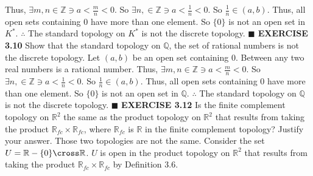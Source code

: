 \documentclass[12pt]{article}
\begin{document}
  Thus, \(\exists m, n \in \mathbb{Z} \ni a < \frac{m}{n} < 0\).
  \newline
  So \(\exists n, \in \mathbb{Z} \ni a < \frac{1}{n} < 0\).
  \newline
  So \(\frac{1}{n} \in (a,b)\).
  \newline
  Thus, all open sets containing 0 have more than one element.
  \newline
  So \(\{0\}\) is not an open set in \(K^*\).
  \newline
  \(\therefore\) The standard topology on \(K^*\) is not the discrete topology.
  \newline \(\blacksquare\)
  \newpage
  \noindent
  \textbf{EXERCISE 3.10} Show that the standard topology on \(\mathbb{Q}\), the set of rational numbers is not the discrete topology.
  \newline \newline
  Let \((a,b)\) be an open set containing 0.
  \newline
  Between any two real numbers is a rational number.
  \newline
  Thus, \(\exists m, n \in \mathbb{Z} \ni a < \frac{m}{n} < 0\).
  \newline
  So \(\exists n, \in \mathbb{Z} \ni a < \frac{1}{n} < 0\).
  \newline
  So \(\frac{1}{n} \in (a,b)\).
  \newline \newline
  Thus, all open sets containing 0 have more than one element.
  \newline
  So \(\{0\}\) is not an open set in \(\mathbb{Q}\).
  \newline
  \(\therefore\) The standard topology on \(\mathbb{Q}\) is not the discrete topology.
  \newline \(\blacksquare\)
  \newpage
  \noindent
  \textbf{EXERCISE 3.12} Is the finite complement topology on \(\mathbb{R}^2\) the same as the product topology on \(\mathbb{R}^2\) that results from taking the product \(\mathbb{R}_{fc} \times \mathbb{R}_{fc}\), where \(\mathbb{R}_{fc}\) is \(\mathbb{R}\) in the finite complement topology? Justify your answer.
  \newline \newline
  Those two topologies are not the same.
  \newline \newline
  Consider the set \(U = \mathbb{R} - \{0\} \cross \mathbb{R}\).
  \(U\) is open in the product topology on \(\mathbb{R}^2\) that results from taking the product \(\mathbb{R}_{fc} \times \mathbb{R}_{fc}\) by Definition 3.6.
\end{document}

